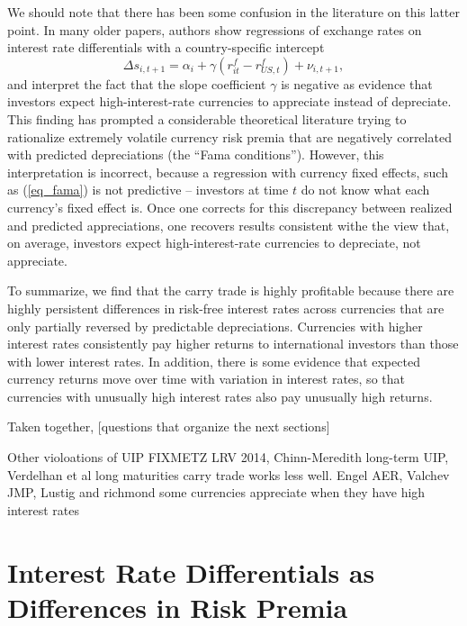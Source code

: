 \documentclass{ar-1col}
\begin{document}
We should note that there has been some confusion in the literature on this latter point. In many older papers, authors show regressions of exchange rates on interest rate differentials with a country-specific intercept \begin{equation}\label{eq_fama}
\Delta s_{i,t+1}=\alpha_i+\gamma\left( r^f_{it}-{r}^f_{US,t}\right) +\nu
_{i,t+1},  
\end{equation}
and interpret the fact that the slope coefficient $\gamma$ is negative as evidence that investors expect high-interest-rate currencies to appreciate instead of depreciate. This finding has prompted a considerable theoretical literature trying to rationalize extremely volatile currency risk premia that are negatively correlated with predicted depreciations (the ``Fama conditions''). However, this interpretation is incorrect, because a regression with currency fixed effects, such as (\ref{eq_fama}) is not predictive -- investors at time $t$ do not know what each currency's fixed effect is. Once one corrects for this discrepancy between realized and predicted appreciations, one recovers results consistent withe the view that, on average, investors expect high-interest-rate currencies to depreciate, not appreciate. 

To summarize, we find that the carry trade is highly profitable because there are highly persistent differences in risk-free interest rates across currencies that are only partially reversed by predictable depreciations. Currencies with higher interest rates consistently pay higher returns to international investors than those with lower interest rates. In addition, there is some evidence that expected currency returns move over time with variation in interest rates, so that currencies with unusually high interest rates also pay unusually high  returns.

Taken together, [questions that organize the next sections]

Other violoations of UIP
FIXMETZ LRV 2014, Chinn-Meredith long-term UIP, Verdelhan et al long maturities carry trade works less well. Engel AER, Valchev JMP, Lustig and richmond
some currencies appreciate when they have high interest rates





\section{Interest Rate Differentials as Differences in Risk Premia}
\end{document}
